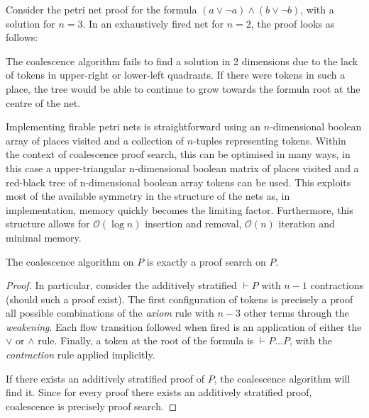     \begin{example}
        Consider the petri net proof for the formula $(a \vee \neg a) \wedge (b \vee \neg b)$, with a solution for $n = 3$.
        In an exhaustively fired net for $n = 2$, the proof looks as follows:
        
        The coalescence algorithm fails to find a solution in 2 dimensions due to the lack of tokens in upper-right or lower-left quadrants.
        If there were tokens in such a place, the tree would be able to continue to grow towards the formula root at the centre of the net.
    \end{example}

    \begin{remark}
        Implementing firable petri nets is straightforward using an $n$-dimensional boolean array of places visited and a collection of $n$-tuples representing tokens.
        Within the context of coalescence proof search, this can be optimised in many ways, in this case a upper-triangular n-dimensional boolean matrix of places visited and a red-black tree of n-dimensional boolean array tokens can be used.
        This exploits most of the available symmetry in the structure of the nets as, in implementation, memory quickly becomes the limiting factor.
        Furthermore, this structure allows for $\mathcal{O}(\log{}n)$ insertion and removal, $\mathcal{O}(n)$ iteration and minimal memory.
    \end{remark}


    \begin{proposition}
        The coalescence algorithm on $P$ is exactly a proof search on $P$.
    \end{proposition}

    \begin{proof}
        In particular, consider the additively stratified $\vdash P$ with $n - 1$ contractions (should such a proof exist).
        The first configuration of tokens is precisely a proof all possible combinations of the \textit{axiom} rule with $n - 3$ other terms through the \textit{weakening}.
        Each flow transition followed when fired is an application of either the $\vee$ or $\wedge$ rule.
        Finally, a token at the root of the formula is $\vdash P \ldots P$, with the \textit{contraction} rule applied implicitly.

        If there exists an additively stratified proof of $P$, the coalescence algorithm will find it.
        Since for every proof there exists an additively stratified proof, coalescence is precisely proof search.
    \end{proof}

